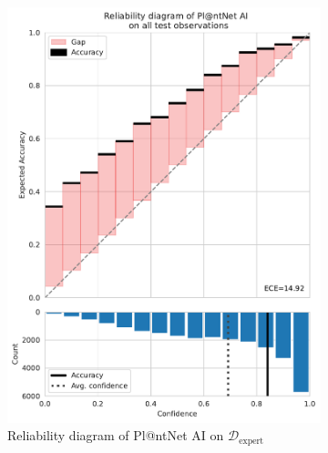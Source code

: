 \begin{figure}[tbh]
    \centering
    \begin{subfigure}[t]{.48\textwidth}
        \centering
    \includegraphics[width=\textwidth]{./images_plantnet/reliability_diagram_all.pdf}
    \caption{Reliability diagram of Pl@ntNet AI on $\mathcal{D}_{\mathrm{expert}}$ }
        \label{fig:reliability-all}
    \end{subfigure}%
    \hfill
    \begin{subfigure}[t]{.48\textwidth}
        \centering

\end{subfigure}
\end{figure}
